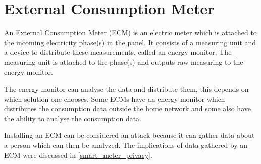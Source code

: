 \section{External Consumption Meter}\label{ecm}
An External Consumption Meter (ECM) is an electric meter which is attached to the incoming electricity phase(s) in the panel.
It consists of a measuring unit and a device to distribute these measurements, called an energy monitor.
The measuring unit is attached to the phase(s) and outputs raw measuring to the energy monitor.

The energy monitor can analyse the data and distribute them, this depends on which solution one chooses.
Some ECMs have an energy monitor which distributes the consumption data outside the home network and some also have the ability to analyse the consumption data.\cite{TED,efergy,open_energy_monitor}

Installing an ECM can be considered an attack because it can gather data about a person which can then be analyzed.
The implications of data gathered by an ECM were discussed in \cref{smart_meter_privacy}.
